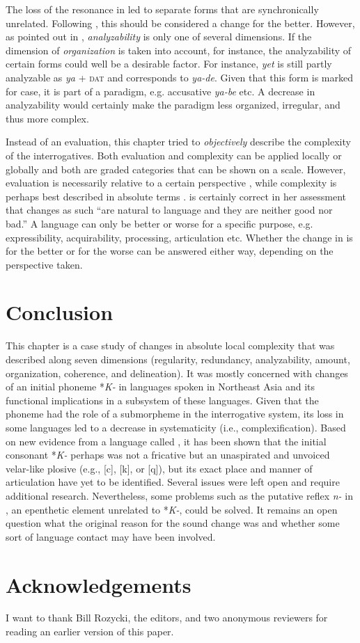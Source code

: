 \documentclass[output=paper,hidelinks]{langscibook}
\begin{document}
The loss of the resonance in  led to separate forms that
are synchronically unrelated. Following \citet{Dixon2016}, this should be considered a change for the better. However, as pointed out in , \textit{analyzability} is only one of several dimensions. If the dimension of \textit{organization} is taken into account, for instance, the analyzability of certain forms could well be a desirable factor. For instance,  \textit{yet} is still partly analyzable as \textit{ya} + \textsc{dat} and corresponds to  \textit{ya-de}. Given that this form is marked for case, it is part of a paradigm, e.g.  accusative \textit{ya-be} etc. A decrease in analyzability would certainly make the paradigm less organized, irregular, and thus more complex.

Instead of an evaluation, this chapter tried to \textit{objectively} describe the complexity of the  interrogatives. Both evaluation and complexity can be applied locally or globally and both are graded categories that can be shown on a scale. However, evaluation is necessarily relative to a certain perspective \citep{Lehmann2006}, while complexity is perhaps best described in absolute terms \citep{Miestamo2008grammatical}. \citet[10]{Bybee2015} is certainly correct in her assessment that changes as such ``are natural to language and they are neither good nor bad.” A language can only be better or worse for a specific purpose, e.g. expressibility, acquirability, processing, articulation etc. Whether the change in  is for the better or for the worse can be answered either way, depending on the perspective taken.

\section{Conclusion}\label{sec5}

This chapter is a case study of changes in absolute local complexity that was described along seven dimensions (regularity, redundancy, analyzability, amount, organization, coherence, and delineation). It was mostly concerned with changes of an initial phoneme *\textit{K-} in  languages spoken in Northeast Asia and its functional implications in a subsystem of these languages. Given that the phoneme had the role of a submorpheme in the interrogative system, its loss in some  languages led to a decrease in systematicity (i.e., complexification). Based on new evidence from a language called , it has been shown that the initial consonant *\textit{K-} perhaps was not a fricative but an unaspirated and unvoiced velar-like plosive (e.g., [c], [k], or [q]), but its exact place and manner of articulation have yet to be identified. Several issues were left open and require additional research. Nevertheless, some problems such as the putative reflex \textit{n-} in , an epenthetic element unrelated to *\textit{K-}, could be solved. It remains an open question what the original reason for the sound change was and whether some sort of language contact may have been involved.


\section*{Acknowledgements}

I want to thank Bill Rozycki, the editors, and two anonymous reviewers for reading an earlier version of this paper.

{\sloppy\printbibliography[heading=subbibliography,notkeyword=this]}
\end{document}
